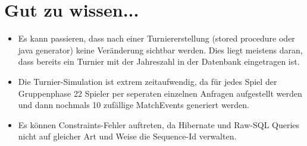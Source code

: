 \documentclass[11pt,german]{scrartcl}
\begin{document}
\section*{Gut zu wissen...}
\begin{itemize}
\item Es kann passieren, dass nach einer Turniererstellung (stored procedure oder java generator) keine Veränderung sichtbar werden.
Dies liegt meistens daran, dass bereits ein Turnier mit der Jahreszahl in der Datenbank eingetragen ist.

\item Die Turnier-Simulation ist extrem zeitaufwendig, da für jedes Spiel der Gruppenphase 22 Spieler per seperaten einzelnen Anfragen aufgestellt werden und dann nochmals 10 zufällige MatchEvents generiert werden.

\item Es können Constraints-Fehler auftreten, da Hibernate und Raw-SQL Queries nicht auf gleicher Art und Weise die Sequence-Id verwalten.
\end{itemize}
\end{document}
